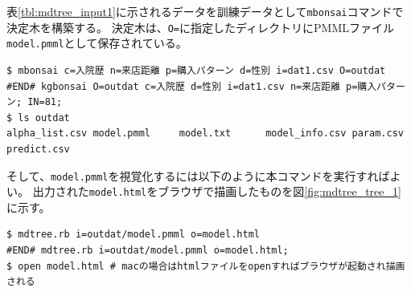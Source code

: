 表\ref{tbl:mdtree_input1}に示されるデータを訓練データとして\verb|mbonsai|コマンドで決定木を構築する。
決定木は、\verb|O=|に指定したディレクトリにPMMLファイル\verb|model.pmml|として保存されている。

\begin{Verbatim}[baselinestretch=0.7,frame=single]
$ mbonsai c=入院歴 n=来店距離 p=購入パターン d=性別 i=dat1.csv O=outdat
#END# kgbonsai O=outdat c=入院歴 d=性別 i=dat1.csv n=来店距離 p=購入パターン; IN=81;
$ ls outdat
alpha_list.csv model.pmml     model.txt      model_info.csv param.csv      predict.csv
\end{Verbatim}

そして、\verb|model.pmml|を視覚化するには以下のように本コマンドを実行すればよい。
出力された\verb|model.html|をブラウザで描画したものを図\ref{fig:mdtree_tree_1}に示す。

\begin{Verbatim}[baselinestretch=0.7,frame=single]
$ mdtree.rb i=outdat/model.pmml o=model.html
#END# mdtree.rb i=outdat/model.pmml o=model.html;
$ open model.html # macの場合はhtmlファイルをopenすればブラウザが起動され描画される
\end{Verbatim}

